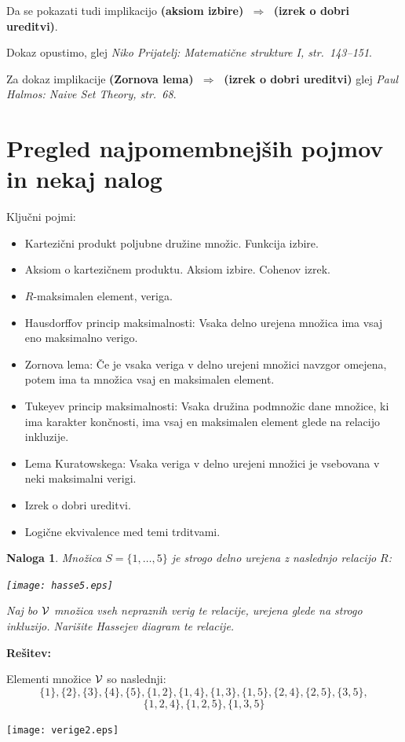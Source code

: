 \documentclass[11pt,paper=b5,footinclude,headinclude]{scrbook} %
\def\sledi {{~\Rightarrow~}}
\newtheorem*{problem}{Naloga}
\begin{document}
Da se pokazati tudi implikacijo \textbf{(aksiom izbire) $\sledi$ (izrek o dobri ureditvi)}.

Dokaz opustimo, glej \emph{ Niko Prijatelj: Matemati\v cne strukture I, str.~143--151}.

Za dokaz implikacije \textbf{(Zornova lema) $\sledi$ (izrek o dobri ureditvi)}
glej \emph{ Paul Halmos: Naive Set Theory, str.~68}.

\section{Pregled najpomembnejših pojmov in nekaj nalog}

Ključni pojmi:
\begin{itemize}
\item Kartezični produkt poljubne družine množic.
Funkcija izbire.
\item Aksiom o kartezičnem produktu. Aksiom izbire. Cohenov izrek.
\item $R$-maksimalen element, veriga.
\item Hausdorffov princip maksimalnosti: Vsaka delno urejena množica ima vsaj eno maksimalno verigo.
\item Zornova lema: Če je vsaka veriga v delno urejeni množici navzgor omejena, potem ima ta množica vsaj en maksimalen element.
\item Tukeyev princip maksimalnosti: Vsaka družina podmnožic dane množice, ki ima karakter končnosti, ima vsaj en maksimalen element glede na relacijo inkluzije.
\item Lema Kuratowskega: Vsaka veriga v delno urejeni množici je vsebovana v neki maksimalni verigi.
\item Izrek o dobri ureditvi.
\item Logične ekvivalence med temi trditvami.
\end{itemize}

\begin{problem}
Množica $S=\{1,\ldots,5\}$ je strogo delno urejena z naslednjo relacijo $R$:
\begin{center}
\texttt{[image: hasse5.eps]}
\end{center}
Naj bo ${\cal V}$ množica vseh nepraznih verig te relacije, urejena glede na strogo inkluzijo.
Narišite Hassejev diagram te relacije.
\end{problem}

\textbf{Rešitev:}

Elementi množice ${\cal V}$ so naslednji:
$$\{1\},\{2\},\{3\},\{4\},\{5\},
 \{1,2\}, \{1,4\}, \{1,3\}, \{1,5\},\{2,4\},\{2,5\},\{3,5\},$$
$$ \{1,2,4\}, \{1,2,5\}, \{1,3,5\}$$
\begin{center}
\texttt{[image: verige2.eps]}
\end{center}
\end{document}
